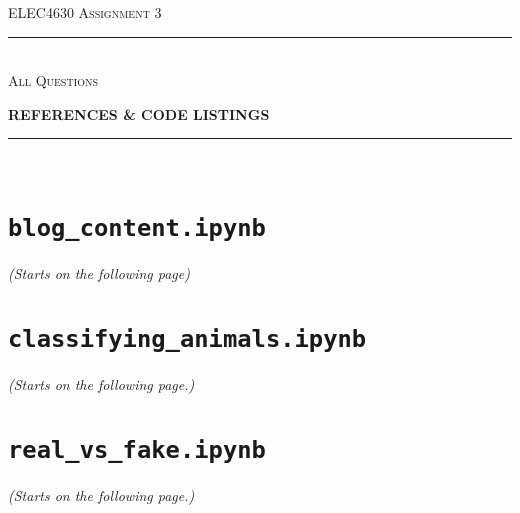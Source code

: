 \begin{titlepage}
  \centering

  \textsc{ELEC4630 Assignment 3}\\
  \vspace{9cm}

  \rule{\linewidth}{0.5pt}\\

  \vspace{1em}
  \LARGE\textsc{All Questions}\\
  \vspace{1em}

  \LARGE\uppercase{\textbf{{References \& Code Listings}}}\\

  \rule{\linewidth}{2pt}\\

  \vfill

\end{titlepage}

\printbibliography

\newpage
\appendix

\section{\texttt{blog\_content.ipynb}} \label{app:blog_content_ipynb}
\textit{(Starts on the following page)}


\section{\texttt{classifying\_animals.ipynb}} \label{app:classifying_animals_ipynb}
\textit{(Starts on the following page.)}


\section{\texttt{real\_vs\_fake.ipynb}} \label{app:real_vs_fake_ipynb}
\textit{(Starts on the following page.)}

